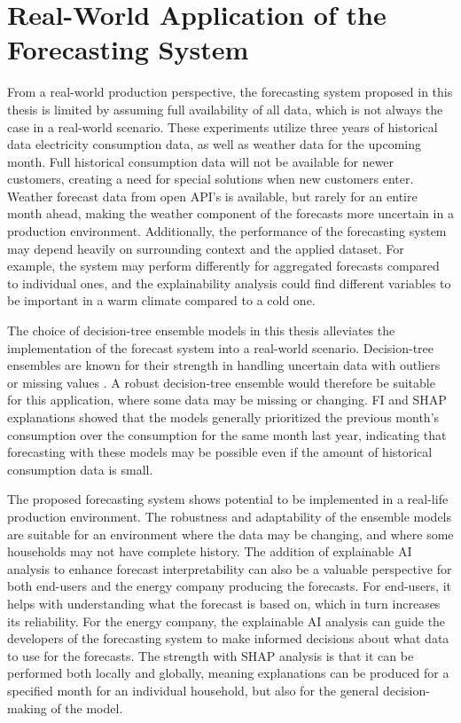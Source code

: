 \section{Real-World Application of the Forecasting System}
From a real-world production perspective, the forecasting system proposed in this thesis is limited by assuming full availability of all data, which is not always the case in a real-world scenario. These experiments utilize three years of historical data electricity consumption data, as well as weather data for the upcoming month. Full historical consumption data will not be available for newer customers, creating a need for special solutions when new customers enter. Weather forecast data from open API's is available, but rarely for an entire month ahead, making the weather component of the forecasts more uncertain in a production environment. Additionally, the performance of the forecasting system may depend heavily on surrounding context and the applied dataset. For example, the system may perform differently for aggregated forecasts compared to individual ones, and the explainability analysis could find different variables to be important in a warm climate compared to a cold one.

The choice of decision-tree ensemble models in this thesis alleviates the implementation of the forecast system into a real-world scenario. Decision-tree ensembles are known for their strength in handling uncertain data with outliers or missing values \cite{sagi_ensemble_2018,dong_survey_2020}. A robust decision-tree ensemble would therefore be suitable for this application, where some data may be missing or changing. FI and SHAP explanations showed that the models generally prioritized the previous month's consumption over the consumption for the same month last year, indicating that forecasting with these models may be possible even if the amount of historical consumption data is small.

The proposed forecasting system shows potential to be implemented in a real-life production environment. The robustness and adaptability of the ensemble models are suitable for an environment where the data may be changing, and where some households may not have complete history. The addition of explainable AI analysis to enhance forecast interpretability can also be a valuable perspective for both end-users and the energy company producing the forecasts. For end-users, it helps with understanding what the forecast is based on, which in turn increases its reliability. For the energy company, the explainable AI analysis can guide the developers of the forecasting system to make informed decisions about what data to use for the forecasts. The strength with SHAP analysis is that it can be performed both locally and globally, meaning explanations can be produced for a specified month for an individual household, but also for the general decision-making of the model.